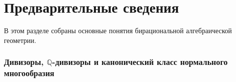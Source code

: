 \documentclass[11pt,a4paper]{article}
\theoremstyle{plain}
\theoremstyle{definition}
\theoremstyle{remark}
\newcommand{\Q}{\mathbb{Q}}
\newcommand{\PP}{\mathbb{P}}
\begin{document}

\part{Предварительные сведения}

В этом разделе собраны основные понятия бирациональной алгебраической геометрии.

\section{Дивизоры, \texorpdfstring{$\Q$}{Q}-дивизоры и канонический класс нормального многообразия}\label{sec:div}
\end{document}
